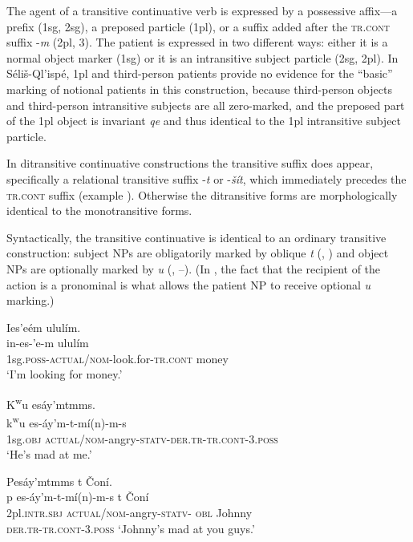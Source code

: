 \documentclass[output=paper,colorlinks,citecolor=brown]{langscibook}
\begin{document}
The agent of a transitive continuative verb is expressed by a
possessive affix---a prefix (1sg, 2sg), a preposed particle (1pl),
or a suffix added after the \textsc{tr.cont} suffix -\emph{m} (2pl,
3).  The patient is expressed in two different ways: either it is a
normal object marker (1sg) or it is an intransitive subject particle
(2sg, 2pl).  In S\'eli\v{s}-Ql'isp\'e, 1pl and third-person patients
provide no evidence for the ``basic'' marking of notional patients in
this construction, because third-person objects and third-person
intransitive subjects are all zero-marked, and the preposed part of
the 1pl object is invariant \emph{qe} and thus identical to the 1pl
intransitive subject particle.

In ditransitive continuative constructions the transitive suffix does
appear, specifically a relational transitive suffix -\emph{{\textltilde}t} or -\emph{\v{s}\'it}, which immediately precedes the
\textsc{tr.cont} suffix (example ).  Otherwise the ditransitive forms
are morphologically identical to the monotransitive forms.

Syntactically, the transitive continuative is identical to an ordinary
transitive construction: subject NPs are obligatorily marked by
oblique \emph{t} (, ) and object NPs are optionally marked by \emph{{\textltilde}u} (, --).  (In , the fact that the recipient of
the action is a pronominal is what allows the patient NP to receive
optional \emph{{\textltilde}u} marking.)

\ea 
\label{ex-thomason-24}
Ies{\textcrlambda}'e\textglotstop\'em ulul\'im.  \\
\gll in-es-{\textcrlambda}'e\textglotstop-m ulul\'im \\
1sg.\textsc{poss}-\textsc{actual/nom}-look.for-\textsc{tr.cont} money \\
\glt `I'm looking for money.'
\z

\ea 
\label{ex-thomason-25}
{K\textsuperscript w}u es\'ay'mtmms. \\
\gll  
{k\textsuperscript w}u es-\textrevglotstop\'ay'm-t-m\'i(n)-m-s \\
1sg.\textsc{obj} \textsc{actual/nom}-angry-\textsc{statv-der.tr-tr.cont}-3.\textsc{poss} \\
\glt `He's mad at me.'
\z

\ea 
\label{ex-thomason-26}
Pes\'ay'mtmms t \v{C}on\'i.  \\
\gll p es-\textrevglotstop\'ay'm-t-m\'i(n)-m-s t \v{C}on\'i \\
2pl.\textsc{intr.sbj} \textsc{actual/nom}-angry-\textsc{statv-}
 \textsc{obl} Johnny \\
\textsc{der.tr-tr.cont}-3.\textsc{poss}
\glt `Johnny's mad at you guys.' 
\z
\end{document}
